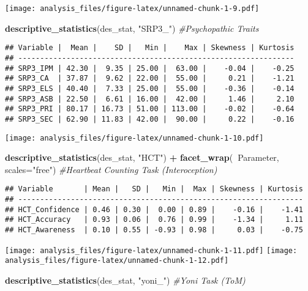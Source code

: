 \documentclass[
]{article}
\newenvironment{Shaded}{\begin{snugshade}}{\end{snugshade}}
\newcommand{\CommentTok}[1]{\textcolor[rgb]{0.56,0.35,0.01}{\textit{#1}}}
\newcommand{\DataTypeTok}[1]{\textcolor[rgb]{0.13,0.29,0.53}{#1}}
\newcommand{\KeywordTok}[1]{\textcolor[rgb]{0.13,0.29,0.53}{\textbf{#1}}}
\newcommand{\NormalTok}[1]{#1}
\newcommand{\OperatorTok}[1]{\textcolor[rgb]{0.81,0.36,0.00}{\textbf{#1}}}
\newcommand{\StringTok}[1]{\textcolor[rgb]{0.31,0.60,0.02}{#1}}
\begin{document}
\texttt{[image: analysis\_files/figure-latex/unnamed-chunk-1-9.pdf]}

\begin{Shaded}
\begin{Highlighting}[]
\KeywordTok{descriptive_statistics}\NormalTok{(des_stat, }\StringTok{"SRP3_"}\NormalTok{)         }\CommentTok{#Psychopathic Traits}
\end{Highlighting}
\end{Shaded}

\begin{verbatim}
## Variable |  Mean |    SD |   Min |    Max | Skewness | Kurtosis
## ---------------------------------------------------------------
## SRP3_IPM | 42.30 |  9.35 | 25.00 |  63.00 |    -0.04 |    -0.25
## SRP3_CA  | 37.87 |  9.62 | 22.00 |  55.00 |     0.21 |    -1.21
## SRP3_ELS | 40.40 |  7.33 | 25.00 |  55.00 |    -0.36 |    -0.14
## SRP3_ASB | 22.50 |  6.61 | 16.00 |  42.00 |     1.46 |     2.10
## SRP3_PRI | 80.17 | 16.73 | 51.00 | 113.00 |    -0.02 |    -0.64
## SRP3_SEC | 62.90 | 11.83 | 42.00 |  90.00 |     0.22 |    -0.16
\end{verbatim}

\texttt{[image: analysis\_files/figure-latex/unnamed-chunk-1-10.pdf]}

\begin{Shaded}
\begin{Highlighting}[]
\KeywordTok{descriptive_statistics}\NormalTok{(des_stat, }\StringTok{"HCT"}\NormalTok{) }\OperatorTok{+}
\StringTok{  }\KeywordTok{facet_wrap}\NormalTok{(}\OperatorTok{~}\NormalTok{Parameter, }\DataTypeTok{scales=}\StringTok{"free"}\NormalTok{)         }\CommentTok{#Heartbeat Counting Task (Interoception)}
\end{Highlighting}
\end{Shaded}

\begin{verbatim}
## Variable       | Mean |   SD |   Min |  Max | Skewness | Kurtosis
## -----------------------------------------------------------------
## HCT_Confidence | 0.46 | 0.30 |  0.00 | 0.89 |    -0.16 |    -1.41
## HCT_Accuracy   | 0.93 | 0.06 |  0.76 | 0.99 |    -1.34 |     1.11
## HCT_Awareness  | 0.10 | 0.55 | -0.93 | 0.98 |     0.03 |    -0.75
\end{verbatim}

\texttt{[image: analysis\_files/figure-latex/unnamed-chunk-1-11.pdf]}
\texttt{[image: analysis\_files/figure-latex/unnamed-chunk-1-12.pdf]}

\begin{Shaded}
\begin{Highlighting}[]
\KeywordTok{descriptive_statistics}\NormalTok{(des_stat, }\StringTok{"yoni_"}\NormalTok{)         }\CommentTok{#Yoni Task (ToM)}
\end{Highlighting}
\end{Shaded}
\end{document}
